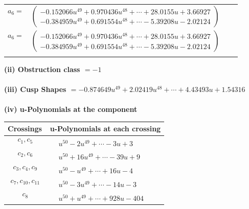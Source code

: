 \documentclass[1p]{elsarticle_modified}
\theoremstyle{definition}
\begin{document}
\begin{tabular}{m{7pt} m{180pt} m{7pt} m{180pt} }
\flushright $a_{6}=$&$\begin{pmatrix}-0.152066 u^{49}+0.970436 u^{48}+\cdots+28.0155 u+3.66927\\-0.384959 u^{49}+0.691554 u^{48}+\cdots-5.39208 u-2.02124\end{pmatrix}$\\ \flushright $a_{6}=$&$\begin{pmatrix}-0.152066 u^{49}+0.970436 u^{48}+\cdots+28.0155 u+3.66927\\-0.384959 u^{49}+0.691554 u^{48}+\cdots-5.39208 u-2.02124\end{pmatrix}$\\&\end{tabular}
\flushleft \textbf{(ii) Obstruction class $= -1$}\\~\\
\flushleft \textbf{(iii) Cusp Shapes $= -0.874649 u^{49}+2.02419 u^{48}+\cdots+4.43493 u+1.54316$}\\~\\
\newpage\renewcommand{\arraystretch}{1}
\flushleft \textbf{(iv) u-Polynomials at the component}\newline \\
\begin{tabular}{m{50pt}|m{274pt}}
Crossings & \hspace{64pt}u-Polynomials at each crossing \\
\hline $$\begin{aligned}c_{1},c_{5}\end{aligned}$$&$\begin{aligned}
&u^{50}-2 u^{49}+\cdots-3 u+3
\end{aligned}$\\
\hline $$\begin{aligned}c_{2},c_{6}\end{aligned}$$&$\begin{aligned}
&u^{50}+16 u^{49}+\cdots-39 u+9
\end{aligned}$\\
\hline $$\begin{aligned}c_{3},c_{4},c_{9}\end{aligned}$$&$\begin{aligned}
&u^{50}- u^{49}+\cdots+16 u-4
\end{aligned}$\\
\hline $$\begin{aligned}c_{7},c_{10},c_{11}\end{aligned}$$&$\begin{aligned}
&u^{50}-3 u^{49}+\cdots-14 u-3
\end{aligned}$\\
\hline $$\begin{aligned}c_{8}\end{aligned}$$&$\begin{aligned}
&u^{50}+u^{49}+\cdots+928 u-404
\end{aligned}$\\
\hline
\end{tabular}\\~\\
\end{document}
